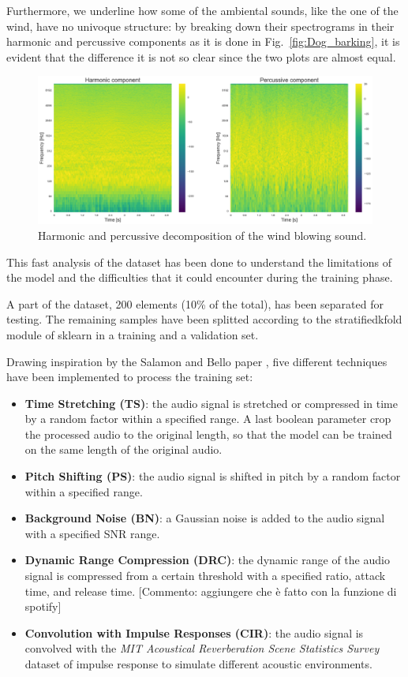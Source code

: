 \documentclass{article}
\begin{document}
\begin{sloppy}
Furthermore, we underline how some of the ambiental sounds, like the one of the wind, have no univoque structure: by breaking down their
spectrograms in their harmonic and percussive components as it is done in Fig.~\ref{fig:Dog_barking}, it is evident that the difference
it is not so clear since the two plots are almost equal.

\begin{figure}[ht]
  \centering
  \centerline{\includegraphics[width=\columnwidth]{Harmonic_Percussive_Wind.png}}
  \caption{Harmonic and percussive decomposition of the wind blowing sound.}
  \label{fig:Harmonic_Percussive_Wind}
\end{figure}

This fast analysis of the dataset has been done to understand the limitations of the model and the difficulties that it could encounter during the training phase.

A part of the dataset, 200 elements (10\% of the total), has been separated for testing. The remaining samples have been splitted according to the stratifiedkfold module of sklearn \cite{scikit-learn_stratifiedkfold} in a training and a validation set.

Drawing inspiration by the Salamon and Bello paper \cite{salamon2017deep}, five different techniques have been implemented to process the training set:
\begin{itemize}
    \item \textbf{Time Stretching (TS)}: the audio signal is stretched or compressed in time by a random factor within a specified range. A last boolean parameter crop the processed audio to the original length, so that the model can be trained on the same length of the original audio.
    \item \textbf{Pitch Shifting (PS)}: the audio signal is shifted in pitch by a random factor within a specified range.
    \item \textbf{Background Noise (BN)}: a Gaussian noise is added to the audio signal with a specified SNR range.
    \item \textbf{Dynamic Range Compression (DRC)}: the dynamic range of the audio signal is compressed from a certain threshold with a specified ratio, attack time, and release time. [Commento: aggiungere che è fatto con la funzione di spotify]
    \item \textbf{Convolution with Impulse Responses (CIR)}: the audio signal is convolved with the \textit{MIT Acoustical Reverberation Scene Statistics Survey} dataset of impulse response \cite{traer2016statistics} to simulate different acoustic environments.
\end{itemize}


\end{sloppy}
\end{document}
